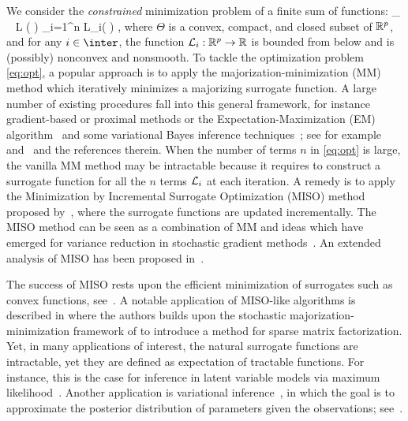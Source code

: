 \documentclass{article}
\begin{document}
We consider the \emph{constrained} minimization problem of a finite sum of  functions:
\beq \label{eq:opt}
\min_{ \param \in \Param }~ {\cal L} ( \param ) \eqdef {} \sum_{i=1}^n {\cal L}_i( \param) \eqsp,
\eeq
where $\Theta$ is a convex, compact, and closed subset of $\rset^p$, and for any $i \in \inter$, the function ${\cal L} _i: \rset^p \to \rset$ is bounded from below and is (possibly) nonconvex and nonsmooth.
To tackle the optimization problem \eqref{eq:opt}, a popular approach is to apply the majorization-minimization (MM) method which iteratively minimizes a majorizing surrogate function. A large number of existing procedures fall into this general framework, for instance gradient-based or proximal methods or  the Expectation-Maximization (EM) algorithm~\cite{mcLachlan2008em} and some variational Bayes inference techniques~\cite{jordan1999var}; see for example~\cite{razaviyayn2013unified} and~\cite{lange2016mm} and the references therein.
When the number of terms $n$ in \eqref{eq:opt} is large, the vanilla MM method may be intractable because it requires to construct a surrogate function for all the $n$ terms ${\cal L}_i$ at each iteration. 
A remedy is to apply the Minimization by Incremental Surrogate Optimization (MISO) method proposed by~\cite{mairal2015miso}, where the surrogate functions are updated incrementally. 
The MISO method can be seen as a combination of MM and ideas which have emerged for variance reduction in stochastic gradient methods~\cite{schmidt2017minimizing}.
An extended analysis of MISO has been proposed in~\cite{qian2019miso}.

The success of MISO rests upon the efficient minimization of surrogates such as convex functions, see~\cite[Section 2.3]{mairal2015miso}. 
A notable application of MISO-like algorithms is described in \cite{mensch2017stochastic} where the authors builds upon the stochastic majorization-minimization framework of \cite{mairal2015miso} to introduce a method for sparse matrix factorization.
Yet, in many applications of interest, the natural surrogate functions are intractable, yet they are defined as expectation of tractable functions. 
For instance, this is the case for inference in latent variable models via maximum likelihood~\cite{mcLachlan2008em}. 
Another application is variational inference~\cite{ghahramani2015probabilistic}, in which  the goal is to approximate the posterior distribution of parameters given the observations;  see~\cite{neal2012bayesian,blundell2015weight,polson2017deep,rezende2014stochastic,li2017dropout}.
\end{document}
